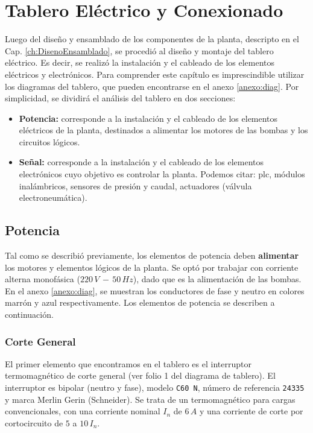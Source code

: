 \chapter{Tablero Eléctrico y Conexionado}
\label{ch:tablero}

Luego del diseño y ensamblado de los componentes de la planta, descripto en el
Cap.
\ref{ch:DisenoEnsamblado}, se procedió al diseño y montaje del
tablero eléctrico.
Es decir, se realizó la instalación y el cableado de los elementos eléctricos y
electrónicos.
Para comprender este capítulo es imprescindible utilizar los diagramas
del tablero, que pueden encontrarse en el anexo \ref{anexo:diag}.
Por simplicidad, se dividirá el análisis del tablero en dos secciones:
\begin{itemize}
 \item \textbf{Potencia:} corresponde a la instalación y el cableado
 de los elementos eléctricos de la planta, destinados a alimentar los motores de 
 las bombas y los circuitos lógicos.
 \item \textbf{Señal:} corresponde a la instalación y el cableado
 de los elementos electrónicos cuyo objetivo es controlar la planta.
 Podemos citar: \gls{plc}, módulos inalámbricos,
 sensores de presión y caudal, actuadores (válvula electroneumática).
\end{itemize}

\section{Potencia}
\label{sec:Potencia}
Tal como se describió previamente, los elementos de potencia deben
\textbf{alimentar} los motores y elementos lógicos de la planta.
Se optó por trabajar con corriente alterna monofásica ($220\,V\,-\,50\,Hz$),
dado que es la alimentación de las bombas.
En el anexo \ref{anexo:diag}, se muestran los conductores de fase y neutro en
colores marrón y azul respectivamente.
Los elementos de potencia se describen a continuación.

\subsection{Corte General}
\label{subsec:corteGeneral}
El primer elemento que encontramos en el tablero es el interruptor
termomagnético de corte general (ver folio 1 del diagrama de tablero).
El interruptor es bipolar (neutro y fase), modelo \verb|C60 N|, número de
referencia \verb|24335| y marca Merlin Gerin (Schneider).
Se trata de un termomagnético para cargas convencionales, con una corriente
nominal $I_n$ de $6\,A$ y una corriente de corte por cortocircuito de $5$ a
$10\,I_n$.

